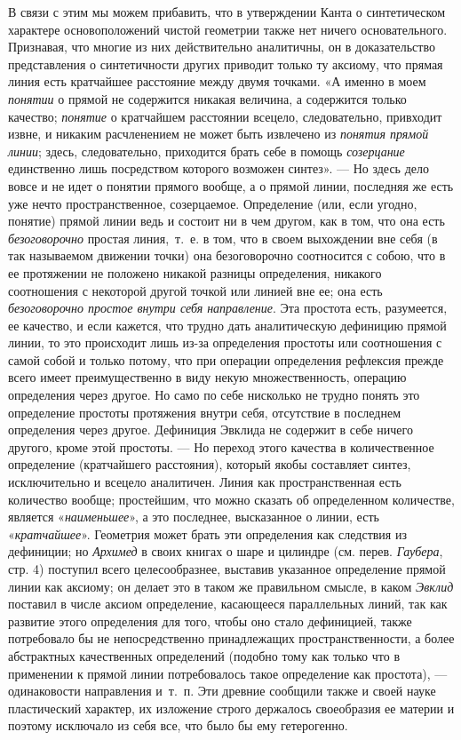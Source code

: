 В связи с этим мы можем прибавить, что в утверждении Канта о синтетическом
характере основоположений чистой геометрии также нет ничего основательного.
Признавая, что многие из них действительно аналитичны, он в доказательство
представления о синтетичности других приводит только ту аксиому, что прямая
линия есть кратчайшее расстояние между двумя точками. «А именно в моем
{\em понятии} о прямой не содержится никакая величина,
а содержится только качество; {\em понятие} о
кратчайшем расстоянии всецело, следовательно, привходит извне, и никаким
расчленением не может быть извлечено из {\em понятия
прямой линии}; здесь, следовательно, приходится брать себе в помощь
{\em созерцание} единственно лишь посредством которого
возможен синтез». — Но здесь дело вовсе и не идет о понятии прямого вообще,
а о прямой линии, последняя же есть уже нечто пространственное,
созерцаемое. Определение (или, если угодно, понятие) прямой линии ведь и
состоит ни в чем другом, как в том, что она есть
{\em безоговорочно} простая линия,~т.~е. в том, что в
своем выхождении вне себя (в так называемом движении точки) она
безоговорочно соотносится с собою, что в ее протяжении не положено никакой
разницы определения, никакого соотношения с некоторой другой точкой или
линией вне ее; она есть {\em безоговорочно простое
внутри себя направление}. Эта простота есть, разумеется, ее качество, и
если кажется, что трудно дать аналитическую дефиницию прямой линии, то это
происходит лишь из-за определения простоты или соотношения с самой собой и
только потому, что при операции определения рефлексия прежде всего имеет
преимущественно в виду некую множественность, операцию определения через
другое. Но само по себе нисколько не трудно понять это определение простоты
протяжения внутри себя, отсутствие в последнем определения через другое.
Дефиниция Эвклида не содержит в себе ничего другого, кроме этой простоты. —
Но переход этого качества в количественное определение (кратчайшего
расстояния), который якобы составляет синтез, исключительно и всецело
аналитичен. Линия как пространственная есть количество вообще; простейшим,
что можно сказать об определенном количестве, является
«{\em наименьшее}», а это последнее, высказанное о
линии, есть «{\em кратчайшее}». Геометрия может брать
эти определения как следствия из дефиниции; но
{\em Архимед} в своих книгах о шаре и цилиндре (см.
перев. {\em Гаубера}, стр. 4) поступил всего
целесообразнее, выставив указанное определение прямой линии как аксиому; он
делает это в таком же правильном смысле, в каком
{\em Эвклид} поставил в числе аксиом определение,
касающееся параллельных линий, так как развитие этого определения для того,
чтобы оно стало дефиницией, также потребовало бы не непосредственно
принадлежащих пространственности, а более абстрактных качественных
определений (подобно тому как только что в применении к прямой линии
потребовалось такое определение как простота), — одинаковости направления
и~т.~п. Эти древние сообщили также и своей науке пластический характер, их
изложение строго держалось своеобразия ее материи и поэтому исключало из
себя все, что было бы ему гетерогенно.

